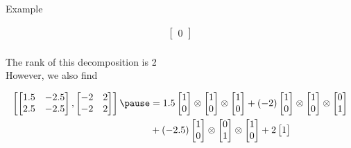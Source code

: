\documentclass{beamer}
\begin{document}
\begin{frame}{Example}
\begin{footnotesize}
\begin{equation*}
\begin{aligned}
\begin{bmatrix}
0
\end{bmatrix}\\
\end{aligned}
\end{equation*}
\end{footnotesize}
\pause
The rank of this decomposition is 2\\
However, we also find
\begin{footnotesize}
\begin{equation*}
\begin{aligned}
\begin{bmatrix}
\begin{bmatrix}
1.5 & -2.5\\
2.5 & -2.5
\end{bmatrix}
,
\begin{bmatrix}
-2 & 2\\
-2 & 2
\end{bmatrix}
\end{bmatrix}
\pause
&=
1.5
\begin{bmatrix}
1\\
0
\end{bmatrix}
\otimes
\begin{bmatrix}
1\\
0
\end{bmatrix}
\otimes
\begin{bmatrix}
1\\
0
\end{bmatrix}
+
(-2)
\begin{bmatrix}
1\\
0
\end{bmatrix}
\otimes
\begin{bmatrix}
1\\
0
\end{bmatrix}
\otimes
\begin{bmatrix}
0\\
1
\end{bmatrix}\\
%
%
%
&+
(-2.5)
\begin{bmatrix}
1\\
0
\end{bmatrix}
\otimes
\begin{bmatrix}
0\\
1
\end{bmatrix}
\otimes
\begin{bmatrix}
1\\
0
\end{bmatrix}
+
2
\begin{bmatrix}
1\\

\end{bmatrix}
\end{aligned}
\end{equation*}
\end{footnotesize}
\end{frame}
\end{document}
